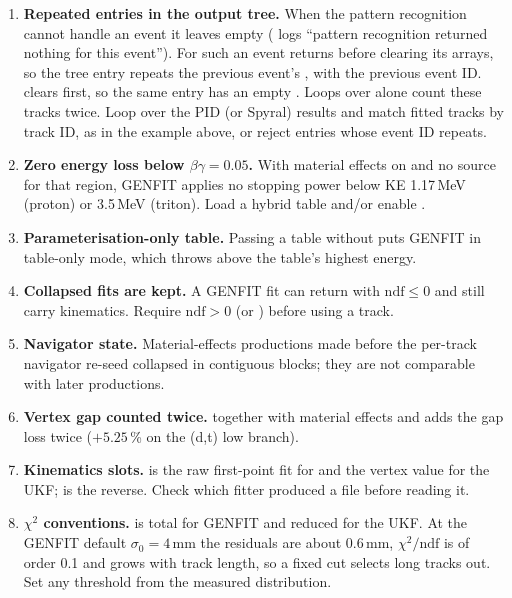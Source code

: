 \begin{enumerate}
\item \textbf{Repeated entries in the output tree.} When the pattern recognition cannot handle an event it leaves
   empty ( logs ``pattern recognition returned nothing for this event''). For such
  an event  returns before clearing its arrays, so the tree entry repeats the previous
  event's , with the previous event ID.  clears first, so the same entry has an
  empty . Loops over  alone count these tracks twice. Loop over the PID (or
  Spyral) results and match fitted tracks by track ID, as in the example above, or reject entries whose event ID
  repeats.
\item \textbf{Zero energy loss below $\beta\gamma=0.05$.} With material effects on and no \dedx{} source for that
  region, GENFIT applies no stopping power below KE 1.17\,MeV (proton) or 3.5\,MeV (triton). Load a hybrid table and/or
  enable .
\item \textbf{Parameterisation-only table.} Passing a table without  puts GENFIT in
  table-only mode, which throws above the table's highest energy.
\item \textbf{Collapsed fits are kept.} A GENFIT fit can return with $\mathrm{ndf}\le0$ and still carry kinematics.
  Require $\mathrm{ndf}>0$ (or ) before using a track.
\item \textbf{Navigator state.} Material-effects productions made before the per-track navigator re-seed collapsed in
  contiguous blocks; they are not comparable with later productions.
\item \textbf{Vertex gap counted twice.}  together with material effects and
   adds the gap loss twice ($+5.25$\,\% on the (d,t) low branch).
\item \textbf{Kinematics slots.}  is the raw first-point fit for  and the
  vertex value for the UKF;  is the reverse. Check which fitter produced a file before
  reading it.
\item \textbf{$\chi^2$ conventions.}  is total for GENFIT and reduced for the UKF. At the GENFIT default
  $\sigma_0=4$\,mm the residuals are about 0.6\,mm, $\chi^2/\mathrm{ndf}$ is of order 0.1 and grows with track length,
  so a fixed cut selects long tracks out. Set any threshold from the measured distribution.

\end{enumerate}
